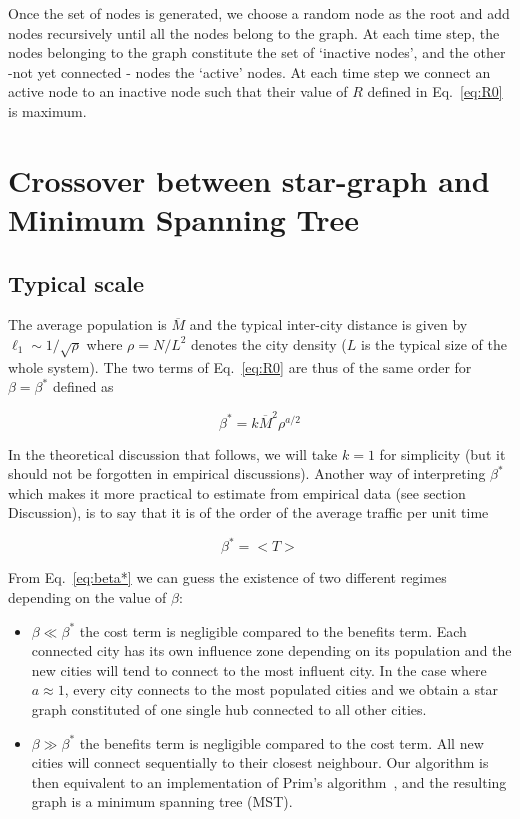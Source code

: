 Once the set of nodes is generated, we choose a random node as the root and add
nodes recursively until all the nodes belong to the graph. At each time step,
the nodes belonging to the graph constitute the set of `inactive nodes', and the
other -not yet connected - nodes the `active' nodes. At each time step we
connect an active node to an inactive node such that their value of $R$ defined
in Eq.~\ref{eq:R0} is maximum.




\section{Crossover between star-graph and Minimum Spanning Tree}

\subsection{Typical scale} 

The average population is $\overline{M}$ and the typical inter-city distance is
given by $\ell_1\sim 1/\sqrt{\rho}$ where $\rho=N/L^2$ denotes the city density
($L$ is the typical size of the whole system). The two terms of Eq.~\ref{eq:R0}
are thus of the same order for $\beta=\beta^*$ defined as

\begin{equation}
    \beta^* = k \overline{M}^2 \rho^{a/2}
    \label{eq:beta*}
\end{equation}

In the theoretical discussion that follows, we will take $k=1$ for simplicity
(but it should not be forgotten in empirical discussions). Another way of
interpreting $\beta^*$ which makes it more practical to estimate from empirical
data (see section Discussion), is to say that it is of the order of the average
traffic per unit time

\begin{equation} 
    \beta^* = < T > 
    \label{eq:beta*_traffic} 
\end{equation}

From Eq.~\ref{eq:beta*} we can guess the existence of two different regimes
depending on the value of $\beta$:

\begin{itemize}
    \item $\beta \ll \beta^*$ the cost term is negligible compared to the
    benefits term. Each connected city has its own influence zone depending on
its population and the new cities will tend to connect to the most influent
city. In the case where $a\approx 1$, every city connects to the most populated
cities and we obtain a star graph constituted of one single hub connected to all
other cities.  
    \item $\beta \gg \beta^*$ the benefits term is negligible
    compared to the cost term. All new cities will connect sequentially to their
    closest neighbour. Our algorithm is then equivalent to an implementation of
    Prim's algorithm~\cite{Prim:1957}, and the resulting graph is a minimum
    spanning tree (MST).  
\end{itemize}

